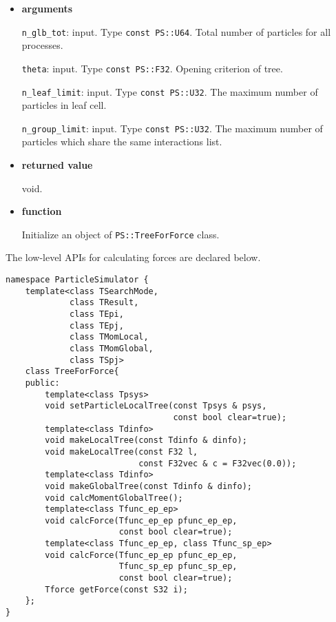 \begin{itemize}

\item {\bf arguments}

{\tt n\_glb\_tot}: input. Type {\tt const PS::U64}. Total number of particles for all processes.

{\tt theta}: input. Type {\tt const PS::F32}. Opening criterion of tree.

{\tt n\_leaf\_limit}: input. Type {\tt const PS::U32}. The maximum number of particles in leaf cell.

{\tt n\_group\_limit}: input. Type {\tt const PS::U32}. The maximum number of particles which share the same interactions list.

\item {\bf returned value}

void.

\item {\bf function}

Initialize an object of {\tt PS::TreeForForce} class.

\end{itemize}


The low-level APIs for calculating forces are declared below.

\begin{lstlisting}[caption=TreeForForce1]
namespace ParticleSimulator {
    template<class TSearchMode,
             class TResult,
             class TEpi,
             class TEpj,
             class TMomLocal,
             class TMomGlobal,
             class TSpj>
    class TreeForForce{
    public:
        template<class Tpsys>
        void setParticleLocalTree(const Tpsys & psys,
                                  const bool clear=true);
        template<class Tdinfo>
        void makeLocalTree(const Tdinfo & dinfo);
        void makeLocalTree(const F32 l,
                           const F32vec & c = F32vec(0.0));
        template<class Tdinfo>
        void makeGlobalTree(const Tdinfo & dinfo);        
        void calcMomentGlobalTree();
        template<class Tfunc_ep_ep>
        void calcForce(Tfunc_ep_ep pfunc_ep_ep,
                       const bool clear=true);  
        template<class Tfunc_ep_ep, class Tfunc_sp_ep>
        void calcForce(Tfunc_ep_ep pfunc_ep_ep,
                       Tfunc_sp_ep pfunc_sp_ep,
                       const bool clear=true);
        Tforce getForce(const S32 i);
    };
}
\end{lstlisting}

